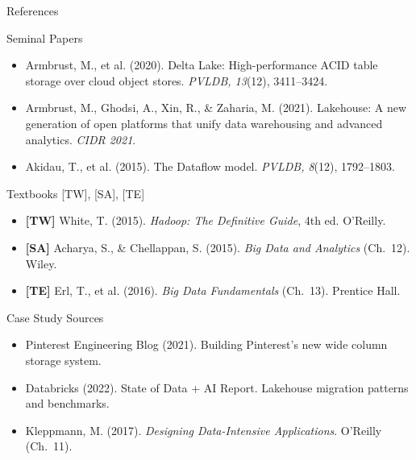 \documentclass[aspectratio=169,10pt]{beamer}
\begin{document}
\begin{frame}{References}
  \begin{block}{Seminal Papers}
    \begin{itemize}
      \item Armbrust, M., et al. (2020). Delta Lake: High-performance
            ACID table storage over cloud object stores.
            \textit{PVLDB, 13}(12), 3411--3424.
      \item Armbrust, M., Ghodsi, A., Xin, R., \& Zaharia, M. (2021).
            Lakehouse: A new generation of open platforms that unify
            data warehousing and advanced analytics.
            \textit{CIDR 2021}.
      \item Akidau, T., et al. (2015). The Dataflow model.
            \textit{PVLDB, 8}(12), 1792--1803.
    \end{itemize}
  \end{block}
  \vspace{4pt}
  \begin{block}{Textbooks \textmd{[TW], [SA], [TE]}}
    \begin{itemize}
      \item \textbf{[TW]} White, T. (2015).
            \textit{Hadoop: The Definitive Guide}, 4th ed. O'Reilly.
      \item \textbf{[SA]} Acharya, S., \& Chellappan, S. (2015).
            \textit{Big Data and Analytics} (Ch.~12). Wiley.
      \item \textbf{[TE]} Erl, T., et al. (2016).
            \textit{Big Data Fundamentals} (Ch.~13). Prentice Hall.
    \end{itemize}
  \end{block}
  \vspace{4pt}
  \begin{block}{Case Study Sources}
    \begin{itemize}
      \item Pinterest Engineering Blog (2021). Building Pinterest's
            new wide column storage system.
      \item Databricks (2022). State of Data + AI Report.
            Lakehouse migration patterns and benchmarks.
      \item Kleppmann, M. (2017). \textit{Designing Data-Intensive
            Applications}. O'Reilly (Ch.~11).
    \end{itemize}
  \end{block}
\end{frame}
\end{document}
